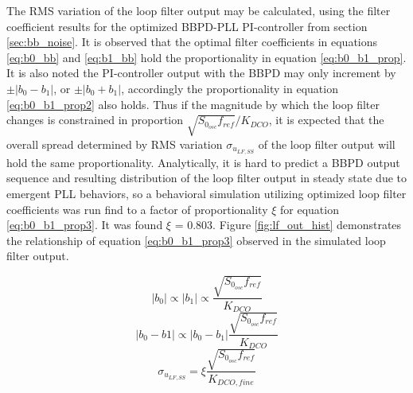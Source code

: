 	The RMS variation of the loop filter output may be calculated, using the filter coefficient results for the optimized BBPD-PLL PI-controller from section \ref{sec:bb_noise}. It is observed that the optimal filter coefficients in equations \ref{eq:b0_bb} and \ref{eq:b1_bb} hold the proportionality in equation \ref{eq:b0_b1_prop}. It is also noted the PI-controller output with the BBPD may only increment by $\pm|b_0-b_1|$, or $\pm|b_0+b_1|$, accordingly the proportionality in equation \ref{eq:b0_b1_prop2} also holds. Thus if the magnitude by which the loop filter changes is constrained in proportion $\sqrt{S_{0_{osc}}f_{ref}}/K_{DCO}$, it is expected that the overall spread determined by RMS variation $\sigma_{u_{LF,SS}}$ of the loop filter output will hold the same proportionality. Analytically, it is hard to predict a BBPD output sequence and resulting distribution of the loop filter output in steady state due to emergent PLL behaviors, so a behavioral simulation utilizing optimized loop filter coefficients was run find to a factor of proportionality $\xi$ for equation \ref{eq:b0_b1_prop3}. It was found $\xi$ = 0.803. Figure \ref{fig:lf_out_hist} demonstrates the relationship of equation \ref{eq:b0_b1_prop3} observed in the simulated loop filter output.

	\begin{equation}\label{eq:b0_b1_prop}
		|b_0| \propto |b_1| \propto \frac{\sqrt{S_{0_{osc}}f_{ref}}}{K_{DCO}}
	\end{equation}
	\begin{equation}\label{eq:b0_b1_prop2}
		|b_0-b1| \propto |b_0-b_1|  \frac{\sqrt{S_{0_{osc}}f_{ref}}}{K_{DCO}} 
	\end{equation}
	\begin{equation}\label{eq:b0_b1_prop3}
		\sigma_{u_{LF,SS}} =  \xi \frac{\sqrt{S_{0_{osc}}f_{ref}}}{K_{DCO,fine}} 
	\end{equation}

